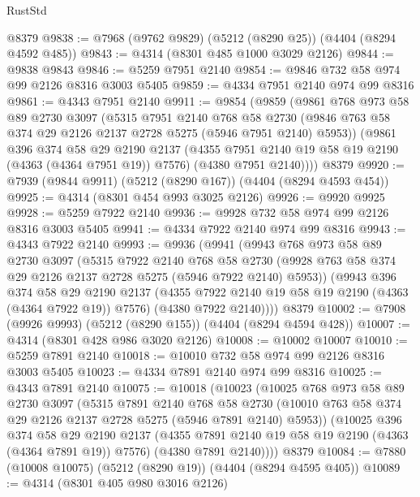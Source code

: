 \begin{lexlean}{RustStd}
\begin{coremodule}
{\begin{coremodule}
{{{{{{{{{{{{{{{{    @8379
@9838 := @7968 (@9762 @9829) (@5212 (@8290 @25)) (@4404 (@8294 @4592 @485))
@9843 := @4314 (@8301 @485 @1000 @3029 @2126)
@9844 := @9838 @9843
@9846 := @5259 @7951 @2140
@9854 := @9846 @732 @58 @974 @99 @2126 @8316 @3003 @5405
@9859 := @4334 @7951 @2140 @974 @99 @8316
@9861 := @4343 @7951 @2140
@9911 := @9854
    (@9859
      (@9861
        @768
        @973
        @58
        @89
        @2730
        @3097
        (@5315
          @7951
          @2140
          @768
          @58
          @2730
          (@9846 @763 @58 @374 @29 @2126 @2137 @2728 @5275 (@5946 @7951 @2140) @5953))
        (@9861
          @396
          @374
          @58
          @29
          @2190
          @2137
          (@4355 @7951 @2140 @19 @58 @19 @2190 (@4363 (@4364 @7951 @19)) @7576)
          (@4380 @7951 @2140))))
    @8379
@9920 := @7939 (@9844 @9911) (@5212 (@8290 @167)) (@4404 (@8294 @4593 @454))
@9925 := @4314 (@8301 @454 @993 @3025 @2126)
@9926 := @9920 @9925
@9928 := @5259 @7922 @2140
@9936 := @9928 @732 @58 @974 @99 @2126 @8316 @3003 @5405
@9941 := @4334 @7922 @2140 @974 @99 @8316
@9943 := @4343 @7922 @2140
@9993 := @9936
    (@9941
      (@9943
        @768
        @973
        @58
        @89
        @2730
        @3097
        (@5315
          @7922
          @2140
          @768
          @58
          @2730
          (@9928 @763 @58 @374 @29 @2126 @2137 @2728 @5275 (@5946 @7922 @2140) @5953))
        (@9943
          @396
          @374
          @58
          @29
          @2190
          @2137
          (@4355 @7922 @2140 @19 @58 @19 @2190 (@4363 (@4364 @7922 @19)) @7576)
          (@4380 @7922 @2140))))
    @8379
@10002 := @7908 (@9926 @9993) (@5212 (@8290 @155)) (@4404 (@8294 @4594 @428))
@10007 := @4314 (@8301 @428 @986 @3020 @2126)
@10008 := @10002 @10007
@10010 := @5259 @7891 @2140
@10018 := @10010 @732 @58 @974 @99 @2126 @8316 @3003 @5405
@10023 := @4334 @7891 @2140 @974 @99 @8316
@10025 := @4343 @7891 @2140
@10075 := @10018
    (@10023
      (@10025
        @768
        @973
        @58
        @89
        @2730
        @3097
        (@5315
          @7891
          @2140
          @768
          @58
          @2730
          (@10010 @763 @58 @374 @29 @2126 @2137 @2728 @5275 (@5946 @7891 @2140) @5953))
        (@10025
          @396
          @374
          @58
          @29
          @2190
          @2137
          (@4355 @7891 @2140 @19 @58 @19 @2190 (@4363 (@4364 @7891 @19)) @7576)
          (@4380 @7891 @2140))))
    @8379
@10084 := @7880 (@10008 @10075) (@5212 (@8290 @19)) (@4404 (@8294 @4595 @405))
@10089 := @4314 (@8301 @405 @980 @3016 @2126)
}}}}}}}}}}}}}}}}
\end{coremodule}}
\end{coremodule}
\end{lexlean}
